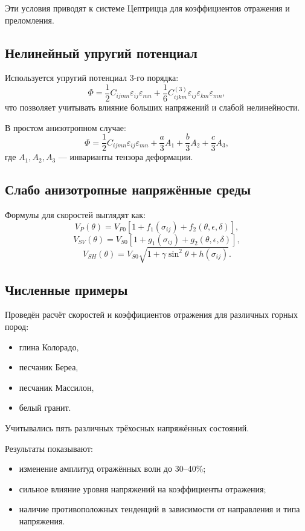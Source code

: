 Эти условия приводят к системе Цептрицца для коэффициентов отражения и преломления.

\subsection*{Нелинейный упругий потенциал}

Используется упругий потенциал 3-го порядка:
\[
\Phi =
\frac12 C_{ijmn}\varepsilon_{ij}\varepsilon_{mn}
+
\frac{1}{6}C_{ijkm}^{(3)} \varepsilon_{ij}\varepsilon_{km}\varepsilon_{mn},
\]
что позволяет учитывать влияние больших напряжений и слабой нелинейности.

В простом анизотропном случае:
\[
\Phi =
\frac12 C_{ijmn}\varepsilon_{ij}\varepsilon_{mn}
+
\frac{a}{3}A_1 + \frac{b}{3}A_2 + \frac{c}{3}A_3,
\]
где $A_1, A_2, A_3$ — инварианты тензора деформации.

\subsection*{Слабо анизотропные напряжённые среды}

Формулы для скоростей выглядят как:
\[
V_P(\theta) = V_{P0}
\left[1 + f_1(\sigma_{ij}) + f_2(\theta, \epsilon, \delta)\right],
\]
\[
V_{SV}(\theta) = V_{S0}
\left[1 + g_1(\sigma_{ij}) + g_2(\theta, \epsilon, \delta)\right],
\]
\[
V_{SH}(\theta) = V_{S0} \sqrt{1 + \gamma \sin^2\theta + h(\sigma_{ij})}.
\]

\subsection*{Численные примеры}

Проведён расчёт скоростей и коэффициентов отражения для различных горных пород:
\begin{itemize}
    \item глина Колорадо,
    \item песчаник Береа,
    \item песчаник Массилон,
    \item белый гранит.
\end{itemize}

Учитывались пять различных трёхосных напряжённых состояний.

Результаты показывают:
\begin{itemize}
    \item изменение амплитуд отражённых волн до 30--40\%;
    \item сильное влияние уровня напряжений на коэффициенты отражения;
    \item наличие противоположных тенденций в зависимости от направления и типа напряжения.
\end{itemize}

